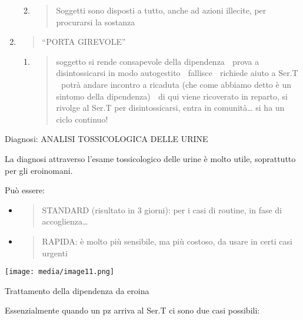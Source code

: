 \documentclass[]{article}
\begin{document}
\begin{enumerate}
  \begin{enumerate}
  \def\labelenumii{\alph{enumii}.}
  \item
    \begin{quote}
    Soggetti sono disposti a tutto, anche ad azioni illecite, per
    procurarsi la sostanza
    \end{quote}
  \end{enumerate}
\item
  \begin{quote}
  ``PORTA GIREVOLE''
  \end{quote}

  \begin{enumerate}
  \def\labelenumii{\alph{enumii}.}
  \item
    \begin{quote}
    soggetto si rende consapevole della dipendenza  prova a
    disintossicarsi in modo autogestito  fallisce  richiede aiuto a
    Ser.T  potrà andare incontro a ricaduta (che come abbiamo detto è
    un sintomo della dipendenza)  di qui viene ricoverato in reparto,
    si rivolge al Ser.T per disintossicarsi, entra in comunità\ldots{}
    si ha un ciclo continuo!
    \end{quote}
  \end{enumerate}
\end{enumerate}

Diagnosi: ANALISI TOSSICOLOGICA DELLE URINE

La diagnosi attraverso l'esame tossicologico delle urine è molto utile,
soprattutto per gli eroinomani.

Può essere:

\begin{itemize}
\item
  \begin{quote}
  STANDARD (risultato in 3 giorni): per i casi di routine, in fase di
  accoglienza\ldots{}
  \end{quote}
\item
  \begin{quote}
  RAPIDA: è molto più sensibile, ma più costoso, da usare in certi casi
  urgenti
  \end{quote}
\end{itemize}

\texttt{[image: media/image11.png]}

Trattamento della dipendenza da eroina

Essenzialmente quando un pz arriva al Ser.T ci sono due casi possibili:
\end{document}
